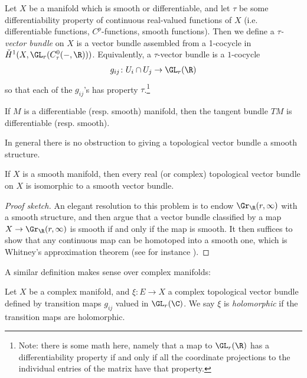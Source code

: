 \documentclass[11pt]{amsart}
\begin{document}
\begin{definition}\label{def:differentiable-vector-bundle} 
Let $X$ be a manifold which is smooth or differentiable, and let $\tau$ be some differentiability property of continuous real-valued functions of $X$ (i.e. differentiable functions, $C^p$-functions, smooth functions). Then we define a \emph{$\tau$-vector bundle} on $X$ is a vector bundle assembled from a 1-cocycle in $\check{H}^1(X, \GL_r(C^0_\tau(-,\R)))$. Equivalently, a $\tau$-vector bundle is a $1$-cocycle
\begin{align*}
    g_{ij} \colon U_i \cap U_j \to \GL_r(\R)
\end{align*}
so that each of the $g_{ij}$'s has property $\tau$.\footnote{Note: there is some math here, namely that a map to $\GL_r(\R)$ has a differentiability property if and only if all the coordinate projections to the individual entries of the matrix have that property.}
\end{definition}


\begin{example} If $M$ is a differentiable (resp. smooth) manifold, then the tangent bundle $TM$ is differentiable (resp. smooth).
\end{example}

In general there is no obstruction to giving a topological vector bundle a smooth structure.

\begin{proposition} If $X$ is a smooth manifold, then every real (or complex) topological vector bundle on $X$ is isomorphic to a smooth vector bundle.
\end{proposition}
\begin{proof}[Proof sketch] An elegant resolution to this problem is to endow $\Gr_\R(r,\infty)$ with a smooth structure, and then argue that a vector bundle classified by a map $X \to \Gr_\R(r,\infty)$ is smooth if and only if the map is smooth. It then suffices to show that any continuous map can be homotoped into a smooth one, which is Whitney's approximation theorem (see for instance \cite[10.16]{leeIntroductionSmoothManifolds2012}).
\end{proof}

A similar definition makes sense over complex manifolds:

\begin{definition}\label{def:holomorphic-vector-bundle} Let $X$ be a complex manifold, and $\xi \colon E \to X$ a complex topological vector bundle defined by transition maps $g_{ij}$ valued in $\GL_r(\C)$. We say $\xi$ is \emph{holomorphic} if the transition maps are holomorphic.
\end{definition}
\end{document}

